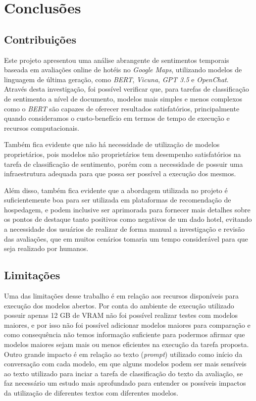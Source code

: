\chapter{Conclusões}
\label{cap:conclusao}

\section{Contribuições}
\label{cap:conclusao:sec:contribuicoes}

Este projeto apresentou uma análise abrangente de sentimentos temporais baseada em avaliações online de hotéis no \textit{Google Maps}, utilizando modelos de linguagem de última geração, como \textit{BERT}, \textit{Vicuna}, \textit{GPT 3.5} e \textit{OpenChat}. Através desta investigação, foi possível verificar que, para tarefas de classificação de sentimento a nível de documento, modelos mais simples e menos complexos como o \textit{BERT} são capazes de oferecer resultados satisfatórios, principalmente quando consideramos o custo-benefício em termos de tempo de execução e recursos computacionais.

Também fica evidente que não há necessidade de utilização de modelos proprietários, pois modelos não proprietários tem desempenho satisfatórios na tarefa de classificação de sentimento, porém com a necessidade de possuir uma infraestrutura adequada para que possa ser possível a execução dos mesmos.

Além disso, também fica evidente que a abordagem utilizada no projeto é suficientemente boa para ser utilizada em plataformas de recomendação de hospedagem, e podem inclusive ser aprimorada para fornecer mais detalhes sobre os pontos de destaque tanto positivos como negativos de um dado hotel, evitando a necessidade dos usuários de realizar de forma manual a investigação e revisão das avaliações, que em muitos cenários tomaria um tempo considerável para que seja realizado por humanos.

\section{Limitações}
\label{cap:conclusao:sec:limitacoes}

Uma das limitações desse trabalho é em relação aos recursos disponíveis para execução dos modelos abertos. Por conta do ambiente de execução utilizado possuir apenas 12 GB de VRAM não foi possível realizar testes com modelos maiores, e por isso não foi possível adicionar modelos maiores para comparação e como consequência não temos informação suficiente para podermos afirmar que modelos maiores sejam mais ou menos eficientes na execução da tarefa proposta. Outro grande impacto é em relação ao texto (\textit{prompt}) utilizado como início da conversação com cada modelo, em que alguns modelos podem ser mais sensíveis ao texto utilizado para inciar a tarefa de classificação do texto da avaliação, se faz necessário um estudo mais aprofundado para entender os possíveis impactos da utilização de diferentes textos com diferentes modelos.

